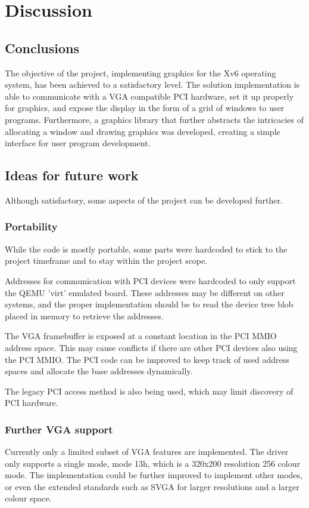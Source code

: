 \chapter{Discussion}
\label{chapter4}

\section{Conclusions}
The objective of the project, implementing graphics for the Xv6 operating system,
has been achieved to a satisfactory level. The solution implementation is 
able to communicate with a VGA compatible PCI hardware, set it up properly for graphics,
and expose the display in the form of a grid of windows to user programs. Furthermore, a 
graphics library that further abstracts the intricacies of allocating a window
and drawing graphics was developed, creating a simple interface for user program
development.
\section{Ideas for future work}
Although satisfactory, some aspects of the project can be developed further.
\subsection{Portability}
While the code is mostly portable, some parts were hardcoded to stick to the project
timeframe and to stay within the project scope. 

Addresses for communication with PCI devices were hardcoded to only support the
QEMU 'virt' emulated board. These addresses may be different on other systems,
and the proper implementation should be to read the device tree blob placed
in memory to retrieve the addresses.

The VGA framebuffer is exposed at a constant location in the PCI MMIO address space.
This may cause conflicts if there are other PCI devices also using the PCI MMIO.
The PCI code can be improved to keep track of used address spaces and allocate the
base addresses dynamically.

The legacy PCI access method is also being used, which may limit discovery of PCI
hardware.
\subsection{Further VGA support}
Currently only a limited subset of VGA features are implemented. The driver only
supports a single mode, mode 13h, which is a 320x200 resolution 256 colour mode.
The implementation could be further improved to implement other modes, or even
the extended standards such as SVGA for larger resolutions and a larger colour
space.

